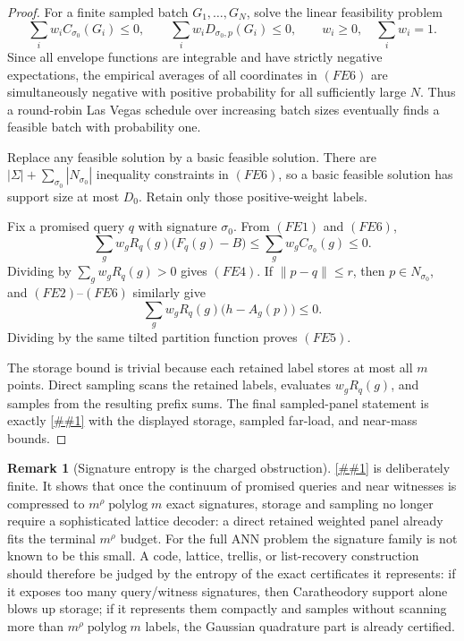 \documentclass[10pt]{article}
\newcommand{\cref}[1]{\ref{##1}}
\newcommand{\Cref}[1]{\ref{##1}}
\theoremstyle{definition}
\newtheorem{remark}[theorem]{Remark}
\newcommand{\polylog}{\operatorname{polylog}}
\begin{document}
\begin{proof}
   For a finite sampled batch \(G_1,\ldots,G_N\), solve the linear feasibility
   problem
   \[
      \sum_iw_i C_{\sigma_0}(G_i)\le0,
      \qquad
      \sum_iw_iD_{\sigma_0,p}(G_i)\le0,
      \qquad
      w_i\ge0,\quad \sum_iw_i=1 .
      \tag{FE6}
   \]
   Since all envelope functions are integrable and have strictly negative
   expectations, the empirical averages of all coordinates in \((FE6)\) are
   simultaneously negative with positive probability for all sufficiently
   large \(N\).  Thus a round-robin Las Vegas schedule over increasing batch
   sizes eventually finds a feasible batch with probability one.

   Replace any feasible solution by a basic feasible solution.  There are
   \(|\Sigma|+\sum_{\sigma_0}|N_{\sigma_0}|\) inequality constraints in
   \((FE6)\), so a basic feasible solution has support size at most \(D_0\).
   Retain only those positive-weight labels.

   Fix a promised query \(q\) with signature \(\sigma_0\).  From \((FE1)\) and
   \((FE6)\),
   \[
      \sum_gw_gR_q(g)\bigl(F_q(g)-B\bigr)
      \le
      \sum_gw_gC_{\sigma_0}(g)
      \le0 .
   \]
   Dividing by \(\sum_gw_gR_q(g)>0\) gives \((FE4)\).  If
   \(\|p-q\|\le r\), then \(p\in N_{\sigma_0}\), and \((FE2)\)--\((FE6)\)
   similarly give
   \[
      \sum_gw_gR_q(g)\bigl(h-A_g(p)\bigr)\le0 .
   \]
   Dividing by the same tilted partition function proves \((FE5)\).

   The storage bound is trivial because each retained label stores at most all
   \(m\) points.  Direct sampling scans the retained labels, evaluates
   \(w_gR_q(g)\), and samples from the resulting prefix sums.  The final
   sampled-panel statement is exactly
   \cref{prop:sampled-structured-panel} with the displayed storage, sampled
   far-load, and near-mass bounds.
\end{proof}

\begin{remark}[Signature entropy is the charged obstruction]
   \label{rem:signature-entropy-obstruction}
   \Cref{cor:small-signature-gaussian-quadrature} is deliberately finite.  It
   shows that once the continuum of promised queries and near witnesses is
   compressed to \(m^\rho\polylog m\) exact signatures, storage and sampling no
   longer require a sophisticated lattice decoder: a direct retained weighted
   panel already fits the terminal \(m^\rho\) budget.  For the full ANN problem
   the signature family is not known to be this small.  A code, lattice,
   trellis, or list-recovery construction should therefore be judged by the
   entropy of the exact certificates it represents: if it exposes too many
   query/witness signatures, then Caratheodory support alone blows up storage;
   if it represents them compactly and samples without scanning more than
   \(m^\rho\polylog m\) labels, the Gaussian quadrature part is already
   certified.
\end{remark}
\end{document}
